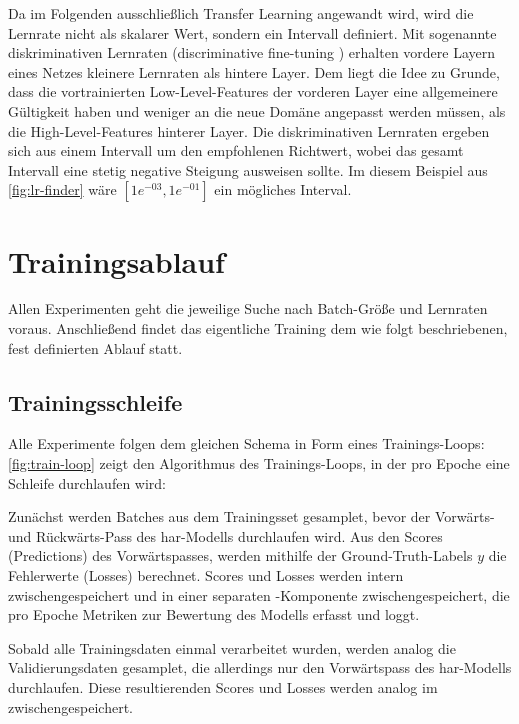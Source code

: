 Da im Folgenden ausschließlich Transfer Learning angewandt wird, wird die Lernrate nicht als skalarer Wert, sondern ein Intervall definiert.
Mit sogenannte diskriminativen Lernraten (discriminative fine-tuning \cite{Howard18}) erhalten vordere Layern eines Netzes kleinere Lernraten als hintere Layer.
Dem liegt die Idee zu Grunde, dass die vortrainierten Low-Level-Features der vorderen Layer eine allgemeinere Gültigkeit haben und weniger an die neue Domäne angepasst werden müssen, als die High-Level-Features hinterer Layer.
Die diskriminativen Lernraten ergeben sich aus einem Intervall um den empfohlenen Richtwert, wobei das gesamt Intervall eine stetig negative Steigung ausweisen sollte.
Im diesem Beispiel aus \autoref{fig:lr-finder} wäre $[1e^{-03}, 1e^{-01}]$ ein mögliches Interval.

\section{Trainingsablauf}
\label{sec:trainingsablauf}

Allen Experimenten geht die jeweilige Suche nach Batch-Größe und Lernraten voraus.
Anschließend findet das eigentliche Training dem wie folgt beschriebenen, fest definierten Ablauf statt.

\subsection{Trainingsschleife}
\label{subsec:trainingsschleife}

Alle Experimente folgen dem gleichen Schema in Form eines Trainings-Loops:
\autoref{fig:train-loop} zeigt den Algorithmus des Trainings-Loops, in der pro Epoche eine Schleife durchlaufen wird:

Zunächst werden Batches aus dem Trainingsset gesamplet, bevor der Vorwärts- und Rückwärts-Pass des \gls{har}-Modells durchlaufen wird.
Aus den Scores (Predictions) des Vorwärtspasses, werden mithilfe der Ground-Truth-Labels $y$ die Fehlerwerte (Losses) berechnet.
Scores und Losses werden intern zwischengespeichert und in einer separaten -Komponente zwischengespeichert, die pro Epoche Metriken zur Bewertung des Modells erfasst und loggt.

Sobald alle Trainingsdaten einmal verarbeitet  wurden, werden analog die Validierungsdaten gesamplet, die allerdings nur den Vorwärtspass des \gls{har}-Modells durchlaufen.
Diese resultierenden Scores und Losses werden analog im  zwischengespeichert.

